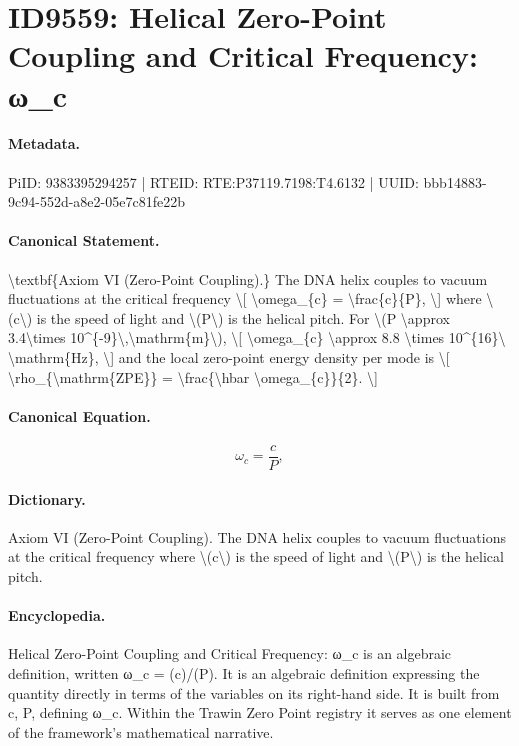 \section*{ID9559: Helical Zero-Point Coupling and Critical Frequency: ω\_c}
\paragraph{Metadata.}
PiID: 9383395294257 | RTEID: RTE:P37119.7198:T4.6132 | UUID: bbb14883-9c94-552d-a8e2-05e7c81fe22b

\paragraph{Canonical Statement.}
\textbackslash{}textbf\{Axiom VI (Zero-Point Coupling).\} The DNA helix couples to vacuum fluctuations at the critical frequency \textbackslash{}[ \textbackslash{}omega\_\{c\} = \textbackslash{}frac\{c\}\{P\}, \textbackslash{}] where \textbackslash{}(c\textbackslash{}) is the speed of light and \textbackslash{}(P\textbackslash{}) is the helical pitch. For \textbackslash{}(P \textbackslash{}approx 3.4\textbackslash{}times 10\textasciicircum{}\{-9\}\textbackslash{},\textbackslash{}mathrm\{m\}\textbackslash{}), \textbackslash{}[ \textbackslash{}omega\_\{c\} \textbackslash{}approx 8.8 \textbackslash{}times 10\textasciicircum{}\{16\}\textbackslash{} \textbackslash{}mathrm\{Hz\}, \textbackslash{}] and the local zero-point energy density per mode is \textbackslash{}[ \textbackslash{}rho\_\{\textbackslash{}mathrm\{ZPE\}\} = \textbackslash{}frac\{\textbackslash{}hbar \textbackslash{}omega\_\{c\}\}\{2\}. \textbackslash{}]

\paragraph{Canonical Equation.}
\[
\omega_{c} = \frac{c}{P},
\]

\paragraph{Dictionary.}
Axiom VI (Zero-Point Coupling). The DNA helix couples to vacuum fluctuations at the critical frequency where \textbackslash{}(c\textbackslash{}) is the speed of light and \textbackslash{}(P\textbackslash{}) is the helical pitch.

\paragraph{Encyclopedia.}
Helical Zero-Point Coupling and Critical Frequency: ω\_c is an algebraic definition, written ω\_c = (c)/(P). It is an algebraic definition expressing the quantity directly in terms of the variables on its right-hand side. It is built from c, P, defining ω\_c. Within the Trawin Zero Point registry it serves as one element of the framework's mathematical narrative.
